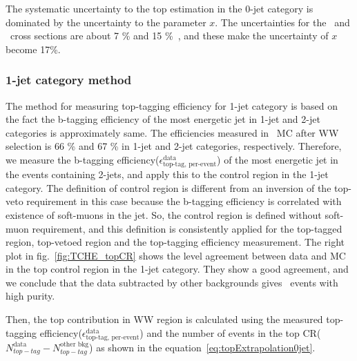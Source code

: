 The systematic uncertainty to the top estimation in the 0-jet category 
is dominated by the uncertainty to the parameter $x$. The uncertainties
for the \ttbar\ and \tw\ cross sections are about 7 \% and 15 \%~\cite{Kidonakis:2012rm}, 
and these make the uncertainty of $x$ become 17\%. 

\subsubsection{1-jet category method}

The method for measuring top-tagging efficiency for 1-jet category is 
based on the fact the b-tagging efficiency of the most energetic jet 
in 1-jet and 2-jet categories is approximately same. The efficiencies 
measured in \ttbar\ MC after WW selection is 66 \% and 67 \% in 1-jet 
and 2-jet categories, respectively. Therefore, we measure the b-tagging 
efficiency($\epsilon_{\textrm{top-tag, per-event}}^{\textrm{data}}$) 
of the most energetic jet in the events containing 2-jets,
and apply this to the control region in the 1-jet category.  
The definition of control region is different from an inversion of 
the top-veto requirement in this case because the b-tagging efficiency 
is correlated with existence of soft-muons in the jet. 
So, the control region is defined without soft-muon requirement, 
and this definition is consistently applied for the top-tagged region, 
top-vetoed region and the top-tagging efficiency measurement.
The right plot in fig.~\ref{fig:TCHE_topCR} shows the level agreement between 
data and MC in the top control region in the 1-jet category.  
They show a good agreement, and we conclude that the data subtracted by other backgrounds 
gives \topbkg\ events with high purity. 

Then, the top contribution in WW region is calculated using the measured
top-tagging efficiency($\epsilon_{\textrm{top-tag, per-event}}^{\textrm{data}}$) 
and the number of events in the top CR($N_{top-tag}^{\textrm{data}}
-N_{top-tag}^{\textrm{other bkg}}$) as shown in the equation~\ref{eq:topExtrapolation0jet}.


